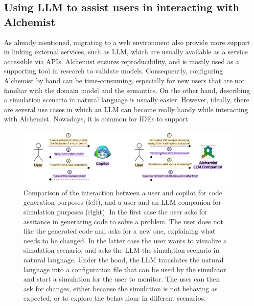 \documentclass[conference]{IEEEtran}
\begin{document}
\subsection{Using \ac{LLM} to assist users in interacting with Alchemist}
As already mentioned,
migrating to a web environment also provide more support in linking external services,
such as \ac{LLM},
which are usually available as a service accessible via \acp{API}.
%
Alchemist ensures reproducibility,
and is mostly used as a supporting tool in research to validate models.
%
Consequently,
configuring Alchemist by hand can be time-consuming,
especially for new users that are not familiar with the domain model and the semantics.
%
On the other hand,
describing a simulation scenario in natural language is usually easier.
%
However,
ideally,
there are several use cases in which an \ac{LLM} can become really handy while interacting with Alchemist.
%
Nowadays,
it is common for \acp{IDE} to support

\begin{figure}
    \includegraphics[width=2\columnwidth]{use-case}
    \caption{
        Comparison of the interaction between a user and copilot for code generation purposes (left),
        and a user and an \ac{LLM} companion for simulation purposes (right).
        In the first case the user asks for assitance in generating code to solve a problem.
        The user does not like the generated code and asks for a new one, explaining what needs to be changed.
        In the latter case the user wants to visualize a simulation scenario, and asks the \ac{LLM} the simulation scenario in natural language.
        Under the hood, the \ac{LLM} translates the natural language into a configuration file that can be used by the simulator and start a simulation for the user to monitor.
        The user can then ask for changes,
        either because the simulation is not behaving as expected,
        or to explore the behavuiour in different scenarios.
    }
    \label{fig:usecase}
\end{figure}

\end{document}
